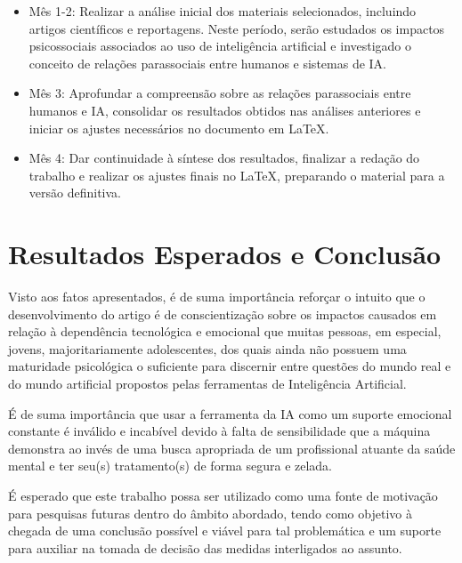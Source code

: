\documentclass[12pt]{article}
\begin{document}
\begin{itemize}
    \item Mês 1-2: Realizar a análise inicial dos materiais selecionados, incluindo artigos científicos e reportagens. Neste período, serão estudados os impactos psicossociais associados ao uso de inteligência artificial e investigado o conceito de relações parassociais entre humanos e sistemas de IA.

    \item Mês 3: Aprofundar a compreensão sobre as relações parassociais entre humanos e IA, consolidar os resultados obtidos nas análises anteriores e iniciar os ajustes necessários no documento em LaTeX.
    
 \item Mês 4: Dar continuidade à síntese dos resultados, finalizar a redação do trabalho e realizar os ajustes finais no LaTeX, preparando o material para a versão definitiva.

\end{itemize}

\section{Resultados Esperados e Conclusão}

Visto aos fatos apresentados, é de suma importância reforçar o intuito que o desenvolvimento do artigo é de conscientização sobre os impactos causados em relação à dependência tecnológica e emocional que muitas pessoas, em especial, jovens, majoritariamente adolescentes, dos quais ainda não possuem uma maturidade psicológica o suficiente para discernir entre questões do mundo real e do mundo artificial propostos pelas ferramentas de Inteligência Artificial. 

É de suma importância que usar a ferramenta da IA como um suporte emocional constante é inválido e incabível devido à falta de sensibilidade que a máquina demonstra ao invés de uma busca apropriada de um profissional atuante da saúde mental e ter seu(s) tratamento(s) de forma segura e zelada.

É esperado que este trabalho possa ser utilizado como uma fonte de motivação para pesquisas futuras dentro do âmbito abordado, tendo como objetivo à chegada de uma conclusão possível e viável para tal problemática e um suporte para auxiliar na tomada de decisão das medidas interligados ao assunto.





\end{document}
